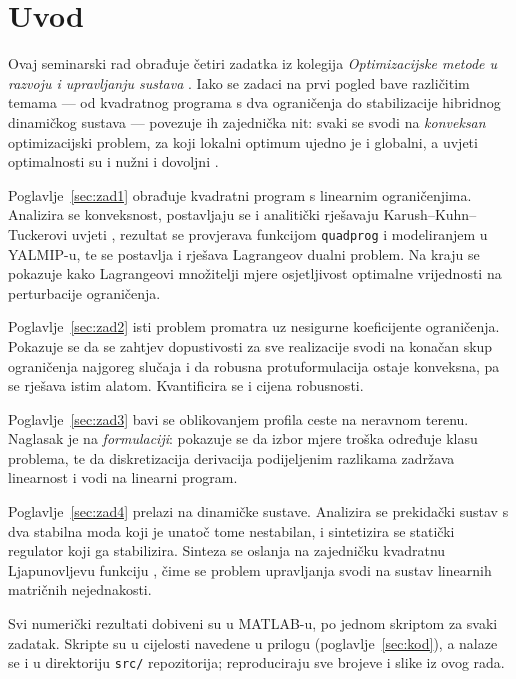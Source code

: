 
\section{Uvod}
\label{sec:uvod}

Ovaj seminarski rad obrađuje četiri zadatka iz kolegija \emph{Optimizacijske
metode u razvoju i upravljanju sustava} \cite{jokic_zadatak}. Iako se zadaci na
prvi pogled bave različitim temama --- od kvadratnog programa s dva ograničenja
do stabilizacije hibridnog dinamičkog sustava --- povezuje ih zajednička nit:
svaki se svodi na \emph{konveksan} optimizacijski problem, za koji lokalni
optimum ujedno je i globalni, a uvjeti optimalnosti su i nužni i dovoljni
\cite[str.~61]{jokic_konveksnost}.

Poglavlje~\ref{sec:zad1} obrađuje kvadratni program s linearnim ograničenjima.
Analizira se konveksnost, postavljaju se i analitički rješavaju
Karush--Kuhn--Tuckerovi uvjeti \cite[str.~59]{jokic_kkt}, rezultat se provjerava
funkcijom \texttt{quadprog} i modeliranjem u YALMIP-u, te se postavlja i rješava
Lagrangeov dualni problem. Na kraju se pokazuje kako Lagrangeovi množitelji
mjere osjetljivost optimalne vrijednosti na perturbacije ograničenja.

Poglavlje~\ref{sec:zad2} isti problem promatra uz nesigurne koeficijente
ograničenja. Pokazuje se da se zahtjev dopustivosti za sve realizacije svodi na
konačan skup ograničenja najgoreg slučaja i da robusna protuformulacija ostaje
konveksna, pa se rješava istim alatom. Kvantificira se i cijena robusnosti.

Poglavlje~\ref{sec:zad3} bavi se oblikovanjem profila ceste na neravnom terenu.
Naglasak je na \emph{formulaciji}: pokazuje se da izbor mjere troška određuje
klasu problema, te da diskretizacija derivacija podijeljenim razlikama zadržava
linearnost i vodi na linearni program.

Poglavlje~\ref{sec:zad4} prelazi na dinamičke sustave. Analizira se prekidački
sustav s dva stabilna moda koji je unatoč tome nestabilan, i sintetizira se
statički regulator koji ga stabilizira. Sinteza se oslanja na zajedničku
kvadratnu Ljapunovljevu funkciju \cite[str.~4]{jokic_ljapunov}, čime se problem
upravljanja svodi na sustav linearnih matričnih nejednakosti.

Svi numerički rezultati dobiveni su u MATLAB-u, po jednom skriptom za svaki
zadatak. Skripte su u cijelosti navedene u prilogu (poglavlje~\ref{sec:kod}), a
nalaze se i u direktoriju \texttt{src/} repozitorija; reproduciraju sve brojeve
i slike iz ovog rada.
